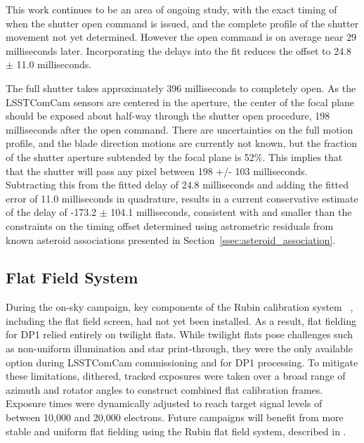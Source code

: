 This work continues to be an area of ongoing study, with the exact timing of when the shutter open command is issued, and the complete profile of the shutter movement not yet determined. However the open command is on average near 29 milliseconds later. Incorporating the delays into the fit reduces the offset to 24.8 $\pm$ 11.0 milliseconds.

The full shutter takes approximately 396 milliseconds to completely open.  As the LSSTComCam sensors are centered in the aperture, the center of the focal plane should be exposed about half-way through the shutter open procedure, 198 milliseconds after the open command. There are uncertainties on the full motion profile, and the blade direction motions are currently not known, but the fraction of the shutter aperture subtended by the focal plane is 52\%. This implies that that the shutter will pass any pixel between 198 +/- 103 milliseconds.  Subtracting this from the fitted delay of 24.8 milliseconds and adding the fitted error of 11.0 milliseconds in quadrature, results in a current conservative estimate of the delay of -173.2 $\pm$ 104.1 milliseconds, consistent with and smaller than the constraints on the timing offset determined using astrometric residuals from known asteroid associations presented in Section~\ref{ssec:asteroid_association}.

\subsection{Flat Field System
\label{ssec:flat_field_system}}
During the on-sky campaign, key components of the Rubin calibration system ~\citep{2022SPIE12182E..0RI}, including the flat field screen, had not yet been installed.
As a result, flat fielding for \gls{DP1} relied entirely on twilight flats.
While twilight flats pose challenges such as non-uniform illumination and star print-through, they were the only available option during \gls{LSSTComCam} commissioning and for DP1 processing.
To mitigate these limitations, dithered, tracked exposures were taken over a broad range of azimuth and rotator angles to construct combined flat \gls{calibration} frames.
Exposure times were dynamically adjusted to reach target signal levels of between 10,000 and 20,000 electrons.
Future campaigns will benefit from more stable and uniform flat fielding using the Rubin flat field system, described in \citet{SITCOMTN-086}.

